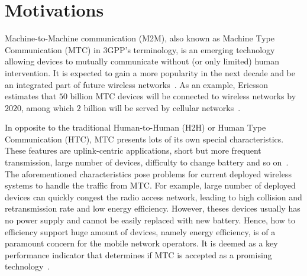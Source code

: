 \section{Motivations}
\label{sec:chapter1-motivations}
Machine-to-Machine communication (M2M), also known as Machine Type Communication (MTC) in 3GPP's terminology, is an emerging technology allowing devices to mutually communicate without (or only limited) human intervention. It is expected to gain a more popularity in the next decade and be an integrated part of future wireless networks~\cite{3GPP/service-requirement}\cite{3GPP/ranimprovements}. As an example, Ericsson estimates that $50$ billion MTC devices will be connected to wireless networks by $2020$, among which $2$ billion will be served by cellular networks~\cite{Eri11}.

In opposite to the traditional Human-to-Human (H2H) or Human Type Communication (HTC), MTC presents lots of its own special characteristics. These features are uplink-centric applications, short but more frequent transmission, large number of devices, difficulty to change battery and so on~\cite{FirstLook12}. The aforementioned characteristics pose problems for current deployed wireless systems to handle the traffic from MTC. For example, large number of deployed devices can quickly congest the radio access network, leading to high collision and retransmission rate and low energy efficiency. However, theses devices usually has no power supply and cannot be easily replaced with new battery. Hence, 
how to efficiency support huge amount of devices, namely energy efficiency,  is of a paramount concern for the mobile network operators. It is 
deemed as a key performance indicator that determines if MTC is accepted as a promising technology~\cite{lu11GRS}\cite{Costa14}. 

